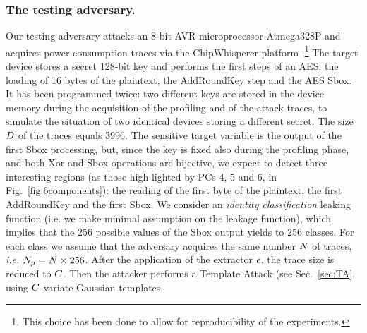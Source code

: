\subsubsection{The testing adversary.}  
Our testing adversary attacks an 8-bit AVR microprocessor Atmega328P and acquires power-consumption traces via the ChipWhisperer platform \cite{o2014chipwhisperer}.\footnote{This choice has been done to allow for reproducibility of the experiments.} The target device stores a secret 128-bit key and performs the first steps of an AES: the loading of 16 bytes of the plaintext, the AddRoundKey step and the AES Sbox. It has been programmed twice: two different keys are stored in the device memory during the acquisition of the profiling and of the attack traces, to simulate the situation of two identical devices storing a different secret. The size $D$ of the traces equals $3996$. The sensitive target  variable is the output of the first Sbox processing, but, since the key is fixed also during the profiling phase, and both Xor and Sbox operations are bijective, we expect to detect three interesting regions (as those high-lighted by PCs 4, 5 and 6, in Fig.~\ref{fig:6components}): the reading of the first byte of the plaintext, the first AddRoundKey and the first Sbox. We consider an {\em identity classification} leaking function (i.e. we make minimal assumption on the leakage function), which implies that the 256 possible values of the Sbox output yields to 256 classes. For each class we assume that the adversary acquires the same number $N$ of traces, \textit{i.e.} $N_p =N\times 256$. After the application of the extractor $\epsilon$, the trace size is reduced to $C$. Then the attacker performs a Template Attack (see Sec.~\ref{sec:TA}, using $C$-variate Gaussian templates.


